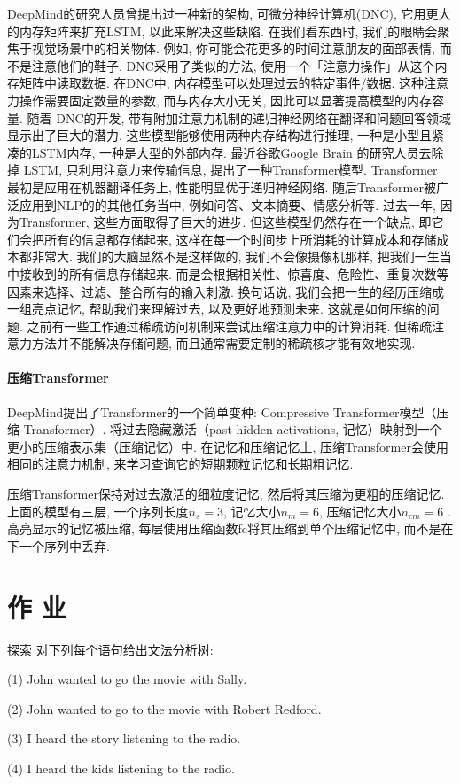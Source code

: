 DeepMind的研究人员曾提出过一种新的架构, 可微分神经计算机(DNC), 它用更大的内存矩阵来扩充LSTM, 以此来解决这些缺陷.
在我们看东西时, 我们的眼睛会聚焦于视觉场景中的相关物体. 例如, 你可能会花更多的时间注意朋友的面部表情, 而不是注意他们的鞋子.
DNC采用了类似的方法, 使用一个「注意力操作」从这个内存矩阵中读取数据.
在DNC中, 内存模型可以处理过去的特定事件/数据. 这种注意力操作需要固定数量的参数, 而与内存大小无关, 因此可以显著提高模型的内存容量.
随着 DNC的开发, 带有附加注意力机制的递归神经网络在翻译和问题回答领域显示出了巨大的潜力. 这些模型能够使用两种内存结构进行推理, 一种是小型且紧凑的LSTM内存, 一种是大型的外部内存.
最近谷歌Google Brain 的研究人员去除掉 LSTM, 只利用注意力来传输信息, 提出了一种Transformer模型.
Transformer 最初是应用在机器翻译任务上, 性能明显优于递归神经网络.
随后Transformer被广泛应用到NLP的的其他任务当中, 例如问答、文本摘要、情感分析等. 过去一年, 因为Transformer, 这些方面取得了巨大的进步.
但这些模型仍然存在一个缺点, 即它们会把所有的信息都存储起来, 这样在每一个时间步上所消耗的计算成本和存储成本都非常大.
我们的大脑显然不是这样做的, 我们不会像摄像机那样, 把我们一生当中接收到的所有信息存储起来. 而是会根据相关性、惊喜度、危险性、重复次数等因素来选择、过滤、整合所有的输入刺激. 换句话说, 我们会把一生的经历压缩成一组亮点记忆, 帮助我们来理解过去, 以及更好地预测未来.
这就是如何压缩的问题.
之前有一些工作通过稀疏访问机制来尝试压缩注意力中的计算消耗. 但稀疏注意力方法并不能解决存储问题, 而且通常需要定制的稀疏核才能有效地实现.

\paragraph{压缩Transformer}

DeepMind提出了Transformer的一个简单变种:  Compressive Transformer模型（压缩 Transformer）.
将过去隐藏激活（past hidden activations, 记忆）映射到一个更小的压缩表示集（压缩记忆）中. 在记忆和压缩记忆上, 压缩Transformer会使用相同的注意力机制, 来学习查询它的短期颗粒记忆和长期粗记忆.

压缩Transformer保持对过去激活的细粒度记忆, 然后将其压缩为更粗的压缩记忆. 上面的模型有三层, 一个序列长度$n_s = 3$, 记忆大小$n_m = 6$, 压缩记忆大小$n_{cm} = 6$ \cite{raecompressive2019}. 高亮显示的记忆被压缩, 每层使用压缩函数fc将其压缩到单个压缩记忆中, 而不是在下一个序列中丢弃.
\section{作 业 }
\begin{custom}[explorecolor]{探索}
对下列每个语句给出文法分析树:

    (1)  John  wanted  to  go  the  movie  with  Sally.

    (2)  John  wanted  to  go  to  the  movie  with  Robert  Redford.

    (3)  I  heard  the  story  listening  to  the  radio.

    (4)  I  heard  the  kids  listening  to  the  radio.
\end{custom}

